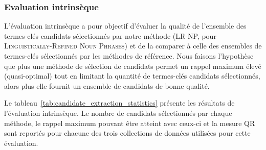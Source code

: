       \subsubsection{Evaluation intrinsèque}
      \label{subsubsec:main-automatic_keyphrase_annotation-keyphrase_candidate_selection-evaluation-intrinsic_evaluation}
        L'évaluation intrinsèque a pour objectif d'évaluer la qualité de
        l'ensemble des termes-clés candidats sélectionnés par notre méthode
        (LR-NP, pour \textsc{Linguistically-Refined Noun Phrases}) et
        de la comparer à celle des ensembles de termes-clés sélectionnés par les
        méthodes de référence. Nous faisons l'hypothèse que plus une
        méthode de sélection de candidats permet un rappel maximum élevé
        (quasi-optimal) tout en limitant la quantité de termes-clés candidats
        sélectionnés, alors plus elle fournit un ensemble de candidats de bonne
        qualité.

        Le tableau~\ref{tab:candidate_extraction_statistics} présente les
        résultats de l'évaluation intrinsèque. Le nombre de candidats
        sélectionnés par chaque méthode, le rappel maximum pouvant être atteint
        avec ceux-ci et la mesure QR sont reportés pour chacune des
        trois collections de données utilisées pour cette évaluation.
        \begin{table}[!h]
          \centering
          \caption{Résultats de l'évaluation intrinsèque des méthodes de
                   sélection des termes-clés candidats
                   \label{tab:candidate_extraction_statistics}}
        \end{table}
        
